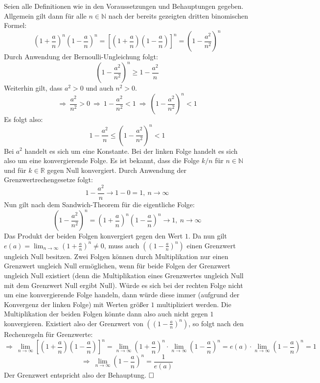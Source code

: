 \documentclass[10pt, a4paper]{article}
\begin{document}
		Seien alle Definitionen wie in den Voraussetzungen und Behauptungen gegeben. Allgemein gilt dann für alle $n \in \mathbb{N}$ nach der bereits gezeigten dritten binomischen Formel:
		\[
			\left(1+\dfrac{a}{n}\right)^n\left(1-\dfrac{a}{n}\right)^n = \left[ \left(1+\dfrac{a}{n}\right) \left(1-\dfrac{a}{n}\right) \right]^n = \left(1-\dfrac{a^2}{n^2}\right)^n
		\]
		Durch Anwendung der Bernoulli-Ungleichung folgt:
		\[
			\left(1-\dfrac{a^2}{n^2}\right)^n \geq 1 - \dfrac{a^2}{n}
		\]
		Weiterhin gilt, dass $a^2 > 0$ und auch $n^2 > 0$.
		\[
			\Rightarrow \ \dfrac{a^2}{n^2} > 0 \ \Rightarrow \ 1-\dfrac{a^2}{n^2} < 1 \ \Rightarrow \ \left( 1-\dfrac{a^2}{n^2} \right)^n < 1
		\]
		Es folgt also:
		\[
			1 - \dfrac{a^2}{n} \leq \left( 1-\dfrac{a^2}{n^2} \right)^n < 1
		\]
		Bei $a^2$ handelt es sich um eine Konstante. Bei der linken Folge handelt es sich also  um eine konvergierende Folge. Es ist bekannt, dass die Folge $k/n$ für $n \in \mathbb{N}$ und für $k \in \mathbb{R}$ gegen Null konvergiert. Durch Anwendung der Grenzwertrechengesetze folgt: 
		\[
			1 - \dfrac{a^2}{n} \longrightarrow 1-0= 1, \ n \longrightarrow \infty
		\]
		Nun gilt nach dem Sandwich-Theorem für die eigentliche Folge:
		\[
			\left(1-\dfrac{a^2}{n^2}\right)^n = \left(1+\dfrac{a}{n}\right)^n\left(1-\dfrac{a}{n}\right)^n \longrightarrow 1, \ n \longrightarrow \infty
		\]
		Das Produkt der beiden Folgen konvergiert gegen den Wert $1$. Da nun gilt $e(a) = \lim_{n\rightarrow\infty}\left( 1+\frac{a}{n} \right)^n\neq 0$, muss auch $\left(\left(1-\frac{a}{n}\right)^n\right)$ einen Grenzwert ungleich Null besitzen. Zwei Folgen können durch Multiplikation nur einen Grenzwert ungleich Null ermöglichen, wenn für beide Folgen der Grenzwert ungleich Null existiert (denn die Multiplikation eines Grenzwertes ungleich Null mit dem Grenzwert Null ergibt Null). Würde es sich bei der rechten Folge nicht um eine konvergierende Folge handeln, dann würde diese immer (aufgrund der Konvergenz der linken Folge) mit Werten größer $1$ multipliziert werden. Die Multiplikation der beiden Folgen könnte dann also auch nicht gegen $1$ konvergieren.
		Existiert also der Grenzwert von $\left(\left(1-\frac{a}{n}\right)^n\right)$, so folgt nach den Rechenregeln für Grenzwerte:
		\[
			\Rightarrow \ \lim_{n\rightarrow\infty}\left[ \left(1+\dfrac{a}{n}\right) \left(1-\dfrac{a}{n}\right) \right]^n = \lim_{n\rightarrow\infty}\left(1+\dfrac{a}{n}\right)^n \cdot \lim_{n\rightarrow\infty}\left(1-\dfrac{a}{n}\right)^n = e(a)\cdot \lim_{n\rightarrow\infty}\left(1-\dfrac{a}{n}\right)^n = 1
		\]
		\[
			\Rightarrow \ \lim_{n\rightarrow\infty}\left(1-\dfrac{a}{n}\right)^n = \dfrac{1}{e(a)}
		\]
		Der Grenzwert entspricht also der Behauptung. $\hfill\Box$
\end{document}
